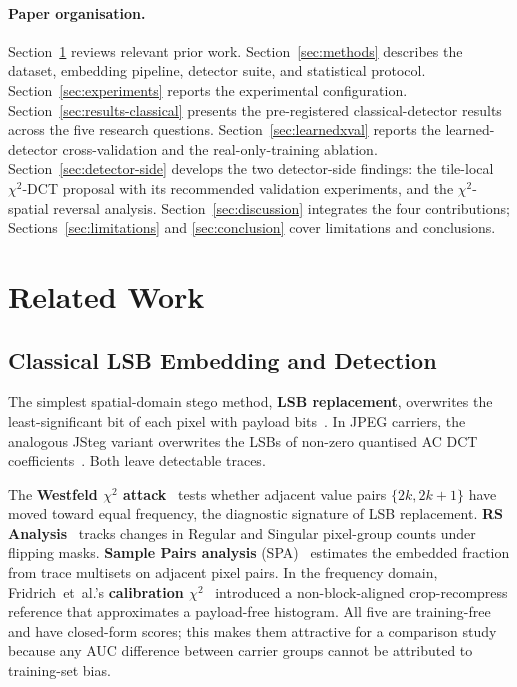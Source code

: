 \documentclass[10pt,twocolumn,a4paper]{article}
\DeclareRobustCommand{\by}[1]{\textnormal{\normalfont\footnotesize\space--- #1}}
\begin{document}
\paragraph{Paper organisation.} Section~\ref{sec:relatedwork} reviews relevant prior work. Section~\ref{sec:methods} describes the dataset, embedding pipeline, detector suite, and statistical protocol. Section~\ref{sec:experiments} reports the experimental configuration. Section~\ref{sec:results-classical} presents the pre-registered classical-detector results across the five research questions. Section~\ref{sec:learnedxval} reports the learned-detector cross-validation and the real-only-training ablation. Section~\ref{sec:detector-side} develops the two detector-side findings: the tile-local $\chi^2$-DCT proposal with its recommended validation experiments, and the $\chi^2$-spatial reversal analysis. Section~\ref{sec:discussion} integrates the four contributions; Sections~\ref{sec:limitations} and \ref{sec:conclusion} cover limitations and conclusions.

\section[Related Work\by{\textbf{Writer:} Abdul Moiz Akbar  \textbf{Reviewer:} Daria \textbf{Contributor:}  Nikolas}]{Related Work}

\label{sec:relatedwork}

\subsection{Classical LSB Embedding and Detection}
The simplest spatial-domain stego method, \textbf{LSB replacement}, overwrites the least-significant bit of each pixel with payload bits~\cite{petitcolas1999,hussain2018}. In JPEG carriers, the analogous JSteg variant overwrites the LSBs of non-zero quantised AC DCT coefficients~\cite{westfeld1999chi,fridrich2003calib}. Both leave detectable traces.

The \textbf{Westfeld $\chi^2$ attack}~\cite{westfeld1999chi} tests whether adjacent value pairs $\{2k,2k\!+\!1\}$ have moved toward equal frequency, the diagnostic signature of LSB replacement. \textbf{RS Analysis}~\cite{fridrich2001lsb} tracks changes in Regular and Singular pixel-group counts under flipping masks. \textbf{Sample Pairs analysis} (SPA)~\cite{dumitrescu2003sp} estimates the embedded fraction from trace multisets on adjacent pixel pairs. In the frequency domain, Fridrich~et~al.'s \textbf{calibration $\chi^2$}~\cite{fridrich2003calib} introduced a non-block-aligned crop-recompress reference that approximates a payload-free histogram. All five are training-free and have closed-form scores; this makes them attractive for a comparison study because any AUC difference between carrier groups cannot be attributed to training-set bias.
\end{document}
